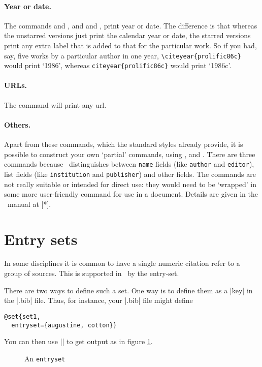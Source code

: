 \paragraph{Year or date.} The commands 
and , and  and , print year
or date. The difference is that whereas the unstarred versions just
print the calendar year or date, the starred versions print any extra
label that is added to that for the particular work. So if you had,
say, five works by a particular author in one year,
\verb|\citeyear{prolific86c}| would print `1986', whereas
\verb|citeyear{prolific86c}| would print `1986c'.

\paragraph{URLs.} The  command will print any url.

\paragraph{Others.} Apart from these commands, which the standard
styles already provide, it is possible to construct your own `partial'
commands, using ,  and . There
are three commands because \biblatex\ distinguishes between
\verb|name| fields (like \texttt{author} and \texttt{editor}), list
fields (like \texttt{institution} and \texttt{publisher}) and other
fields. The commands are not really suitable or intended for direct
use: they would need to be `wrapped' in some more user-friendly
command for use in a document. Details are given in the \biblatex\
manual at [*].

\section{Entry sets}

In some disciplines it is common to have a single numeric citation
refer to a group of sources. This is supported in \biblatex\ by the
entry-set.

There are two ways to define such a set. One way is to define them as
a |key| in the |.bib| file. Thus, for instance, your |.bib| file might
define
\begin{Verbatim}
@set{set1,
  entryset={augustine, cotton}}
\end{Verbatim}
You can then use |\cite{set1}| to get output as in figure \ref{entryset1}.
\begin{figure}
\caption{An \texttt{entryset}\label{entryset1}}
\end{figure}

